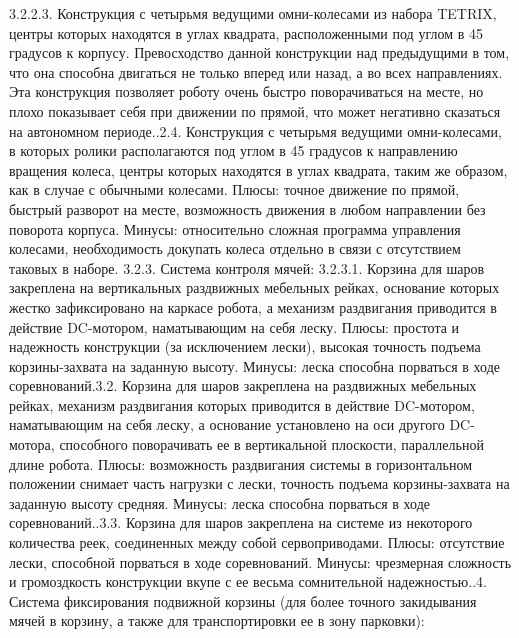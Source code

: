 \documentclass[11pt]{article}
\begin{document}
\begin{enumerate}
            3.2.2.3.   Конструкция с четырьмя ведущими омни-колесами из набора TETRIX, центры которых находятся в углах квадрата, расположенными под углом в 45 градусов к корпусу. Превосходство данной конструкции над предыдущими в том, что она способна двигаться не только вперед или назад, а во всех направлениях. Эта конструкция позволяет роботу очень быстро поворачиваться на месте, но плохо показывает себя при движении по прямой, что может негативно сказаться на автономном периоде..2.4.    Конструкция с четырьмя ведущими омни-колесами, в которых ролики располагаются под углом в 45 градусов к направлению вращения колеса, центры которых находятся в углах квадрата, таким же образом, как в случае с обычными колесами. Плюсы: точное движение по прямой, быстрый разворот на месте, возможность движения в любом направлении без поворота корпуса. Минусы: относительно сложная программа управления колесами, необходимость докупать колеса отдельно в связи с отсутствием таковых в наборе.
            3.2.3.   Система контроля мячей:
            3.2.3.1.   Корзина для шаров закреплена на вертикальных раздвижных мебельных рейках, основание которых жестко зафиксировано на каркасе робота, а механизм раздвигания приводится в действие DC-мотором, наматывающим на себя леску. Плюсы: простота и надежность конструкции (за исключением лески), высокая точность подъема корзины-захвата на заданную высоту. Минусы: леска способна порваться в ходе соревнований.3.2.   Корзина для шаров закреплена на раздвижных мебельных рейках, механизм раздвигания которых приводится в действие DC-мотором, наматывающим на себя леску, а основание установлено на оси другого DC-мотора, способного поворачивать ее в вертикальной плоскости, параллельной длине робота. Плюсы: возможность раздвигания системы в горизонтальном положении снимает часть нагрузки с лески, точность подъема корзины-захвата на заданную высоту средняя. Минусы: леска способна порваться в ходе соревнований..3.3.   Корзина для шаров закреплена на системе из некоторого количества реек, соединенных между собой сервоприводами. Плюсы: отсутствие лески, способной порваться в ходе соревнований. Минусы: чрезмерная сложность и громоздкость конструкции вкупе с ее весьма сомнительной надежностью..4.   Система фиксирования подвижной корзины (для более точного закидывания мячей в корзину, а также для транспортировки ее в зону парковки):\newline

\end{enumerate}
\end{document}
